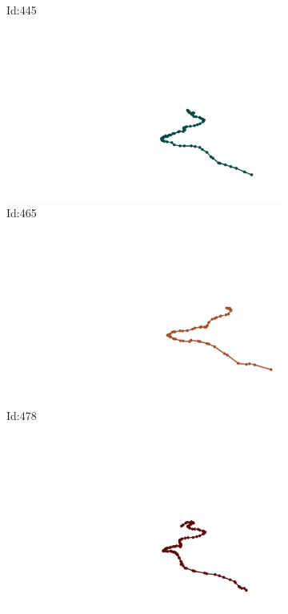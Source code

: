 \documentclass[12pt,twoside]{report}
\begin{document}
\begin{figure}
\begin{subfigure}[b]{0.20\textwidth}
\caption{Id:445}
\end{subfigure}
\begin{subfigure}[b]{0.20\textwidth}
\centering
\includegraphics[width=\textwidth]{../trajectories/465.png}
\caption{Id:465}
\end{subfigure}
\begin{subfigure}[b]{0.20\textwidth}
\centering
\includegraphics[width=\textwidth]{../trajectories/478.png}
\caption{Id:478}
\end{subfigure}
\begin{subfigure}[b]{0.20\textwidth}
\centering
\includegraphics[width=\textwidth]{../trajectories/526.png}

\end{subfigure}
\end{figure}
\end{document}
